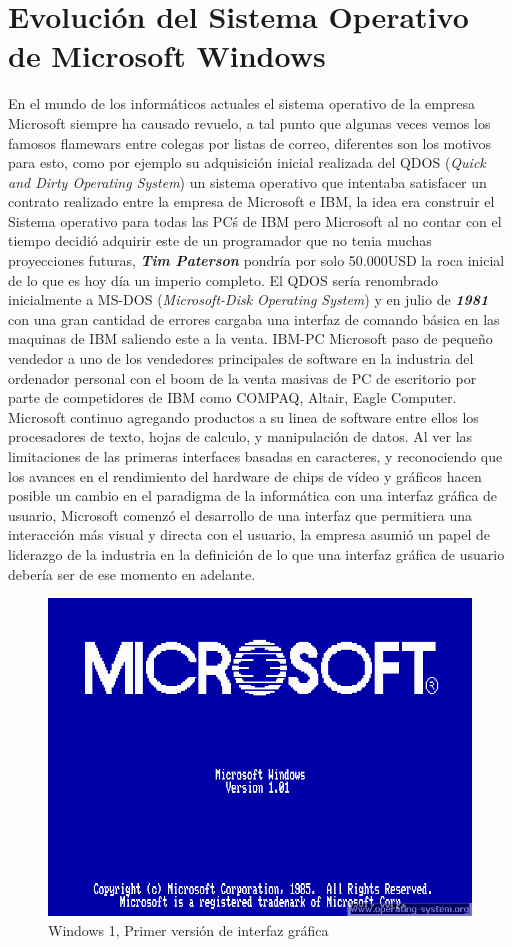 \documentclass[paper=a4, fontsize=12pt]{article} 		%
\numberwithin{equation}{section}						%
\numberwithin{table}{section} 							%
\begin{document}
\section{Evolución del Sistema Operativo de Microsoft Windows}
En el mundo de los informáticos actuales el sistema operativo de la empresa Microsoft siempre ha causado revuelo, a tal punto que algunas veces vemos los famosos flamewars entre colegas por listas de correo, diferentes son los motivos para esto, como por ejemplo su adquisición inicial realizada del QDOS (\textit{Quick and Dirty Operating System}) un sistema operativo que intentaba satisfacer un contrato realizado entre la empresa de Microsoft e IBM, la idea era construir el Sistema operativo para todas las PC\'s de IBM pero Microsoft al no contar con el tiempo decidió adquirir este de un programador que no tenia muchas proyecciones futuras, \textbf{\textit{Tim Paterson}} pondría por solo 50.000USD la roca inicial de lo que es hoy día un imperio completo. 
El QDOS sería renombrado inicialmente a MS-DOS (\textit{Microsoft-Disk Operating System}) y en julio de \textbf{\textit{1981}} con una gran cantidad de errores cargaba una interfaz de comando básica en las maquinas de IBM saliendo este a la venta. IBM-PC Microsoft paso de pequeño vendedor a uno de los vendedores principales de software en la industria del ordenador personal con el boom de la venta masivas de PC de escritorio por parte de competidores de IBM como COMPAQ, Altair, Eagle Computer. Microsoft continuo agregando productos a su linea de software entre ellos los procesadores de texto, hojas de calculo, y manipulación de datos. Al ver las limitaciones de las primeras interfaces basadas en caracteres, y reconociendo que los avances en el rendimiento del hardware de chips de vídeo y gráficos hacen posible un cambio en el paradigma de la informática con una interfaz gráfica de usuario, Microsoft comenzó el desarrollo de una interfaz que permitiera una interacción más visual y directa con el usuario, la empresa asumió un papel de liderazgo de la industria en la definición de lo que una interfaz gráfica de usuario debería ser de ese momento en adelante.
\begin{figure}[H]
 \centering
\includegraphics[scale=0.35]{img/win1.png}
\caption{Windows 1, Primer versión de interfaz gráfica}
\label{fig:dis1}
\end{figure}
\end{document}
